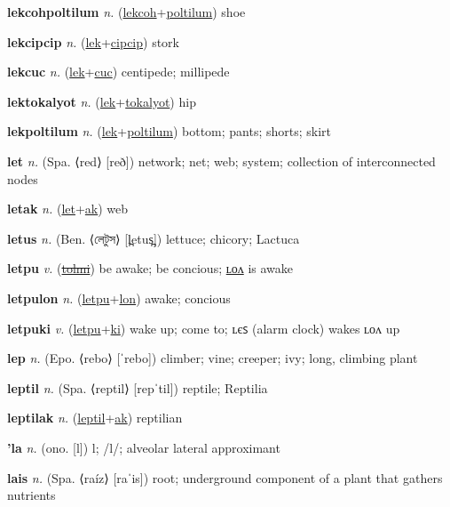 \textbf{\hypertarget{lekcohpoltilum}{lekcohpoltilum}} \textit{n.} (\hyperlink{lekcoh}{lekcoh}+\allowbreak \hyperlink{poltilum}{poltilum})
shoe

\textbf{\hypertarget{lekcipcip}{lekcipcip}} \textit{n.} (\hyperlink{lek}{lek}+\allowbreak \hyperlink{cipcip}{cipcip})
stork

\textbf{\hypertarget{lekcuc}{lekcuc}} \textit{n.} (\hyperlink{lek}{lek}+\allowbreak \hyperlink{cuc}{cuc})
centipede; millipede

\textbf{\hypertarget{lektokalyot}{lektokalyot}} \textit{n.} (\hyperlink{lek}{lek}+\allowbreak \hyperlink{tokalyot}{tokalyot})
hip

\textbf{\hypertarget{lekpoltilum}{lekpoltilum}} \textit{n.} (\hyperlink{lek}{lek}+\allowbreak \hyperlink{poltilum}{poltilum})
bottom; pants; shorts; skirt

\textbf{\hypertarget{let}{let}} \textit{n.} (Spa. ⟨red⟩ [reð])
network; net; web; system; collection of interconnected nodes

\textbf{\hypertarget{letak}{letak}} \textit{n.} (\hyperlink{let}{let}+\allowbreak \hyperlink{ak}{ak})
web

\textbf{\hypertarget{letus}{letus}} \textit{n.} (Ben. ⟨{\bengali{}লেটুস}⟩ [l̪etus̪])
lettuce; chicory; Lactuca

\textbf{\hypertarget{letpu}{letpu}} \textit{v.} (\hyperlink{tolmi}{\sout{tolmi}})
be awake; be concious; \hyperlink{letpulon}{ʟᴏᴧ} is awake

\textbf{\hypertarget{letpulon}{letpulon}} \textit{n.} (\hyperlink{letpu}{letpu}+\allowbreak \hyperlink{lon}{lon})
awake; concious

\textbf{\hypertarget{letpuki}{letpuki}} \textit{v.} (\hyperlink{letpu}{letpu}+\allowbreak \hyperlink{ki}{ki})
wake up; come to; ʟєꜱ (alarm clock) wakes ʟᴏᴧ up

\textbf{\hypertarget{lep}{lep}} \textit{n.} (Epo. ⟨rebo⟩ [ˈrebo])
climber; vine; creeper; ivy; long, climbing plant

\textbf{\hypertarget{leptil}{leptil}} \textit{n.} (Spa. ⟨reptil⟩ [repˈtil])
reptile; Reptilia

\textbf{\hypertarget{leptilak}{leptilak}} \textit{n.} (\hyperlink{leptil}{leptil}+\allowbreak \hyperlink{ak}{ak})
reptilian

\textbf{\hypertarget{'la}{'la}} \textit{n.} (ono. [l])
l; /l/; alveolar lateral approximant

\textbf{\hypertarget{lais}{lais}} \textit{n.} (Spa. ⟨raíz⟩ [raˈis])
root; underground component of a plant that gathers nutrients

